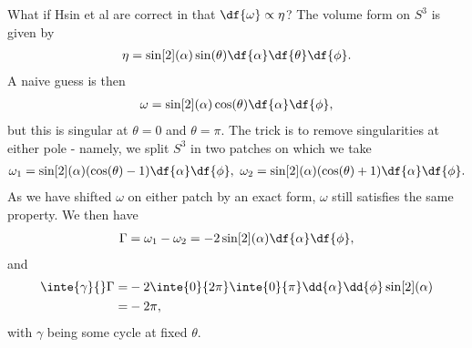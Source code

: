 What if Hsin et al are correct in that $\df{\omega} \propto \eta$? The volume form on $S^{3}$ is given by
\begin{align*}
	\eta = \sin[2](\alpha)\sin(\theta)\df{\alpha}\df{\theta}\df{\phi}.
\end{align*}
A naive guess is then
\begin{align*}
	\omega = \sin[2](\alpha)\cos(\theta)\df{\alpha}\df{\phi},
\end{align*}
but this is singular at $\theta = 0$ and $\theta = \pi$. The trick is to remove singularities at either pole - namely, we split $S^{3}$ in two patches on which we take
\begin{align*}
	\omega_{1} = \sin[2](\alpha)(\cos(\theta) - 1)\df{\alpha}\df{\phi},\ \omega_{2} = \sin[2](\alpha)(\cos(\theta) + 1)\df{\alpha}\df{\phi}.
\end{align*}
As we have shifted $\omega$ on either patch by an exact form, $\omega$ still satisfies the same property. We then have
\begin{align*}
	\Gamma = \omega_{1} - \omega_{2} = -2\sin[2](\alpha)\df{\alpha}\df{\phi},
\end{align*}
and
\begin{align*}
	\inte{\gamma}{}\Gamma =& -2\inte{0}{2\pi}\inte{0}{\pi}\dd{\alpha}\dd{\phi}\sin[2](\alpha) \\
	                      =& -2\pi,
\end{align*}
with $\gamma$ being some cycle at fixed $\theta$.

